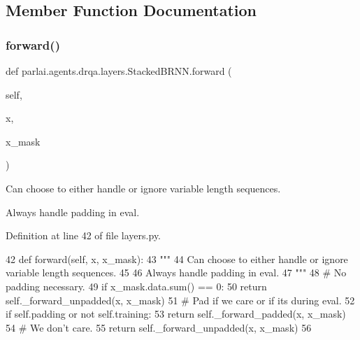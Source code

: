\subsection{Member Function Documentation}
\mbox{\label{classparlai_1_1agents_1_1drqa_1_1layers_1_1StackedBRNN_a77f43de1cd3b3461c3ce791973aa9eb5}} 
\subsubsection{\texorpdfstring{forward()}{forward()}}
{\footnotesize\ttfamily def parlai.\+agents.\+drqa.\+layers.\+Stacked\+B\+R\+N\+N.\+forward (\begin{DoxyParamCaption}\item[{}]{self,  }\item[{}]{x,  }\item[{}]{x\+\_\+mask }\end{DoxyParamCaption})}

\begin{DoxyVerb}Can choose to either handle or ignore variable length sequences.

Always handle padding in eval.
\end{DoxyVerb}
 

Definition at line 42 of file layers.\+py.


\begin{DoxyCode}
42     \textcolor{keyword}{def }forward(self, x, x\_mask):
43         \textcolor{stringliteral}{"""}
44 \textcolor{stringliteral}{        Can choose to either handle or ignore variable length sequences.}
45 \textcolor{stringliteral}{}
46 \textcolor{stringliteral}{        Always handle padding in eval.}
47 \textcolor{stringliteral}{        """}
48         \textcolor{comment}{# No padding necessary.}
49         \textcolor{keywordflow}{if} x\_mask.data.sum() == 0:
50             \textcolor{keywordflow}{return} self.\_forward\_unpadded(x, x\_mask)
51         \textcolor{comment}{# Pad if we care or if its during eval.}
52         \textcolor{keywordflow}{if} self.padding \textcolor{keywordflow}{or} \textcolor{keywordflow}{not} self.training:
53             \textcolor{keywordflow}{return} self.\_forward\_padded(x, x\_mask)
54         \textcolor{comment}{# We don't care.}
55         \textcolor{keywordflow}{return} self.\_forward\_unpadded(x, x\_mask)
56 
\end{DoxyCode}


